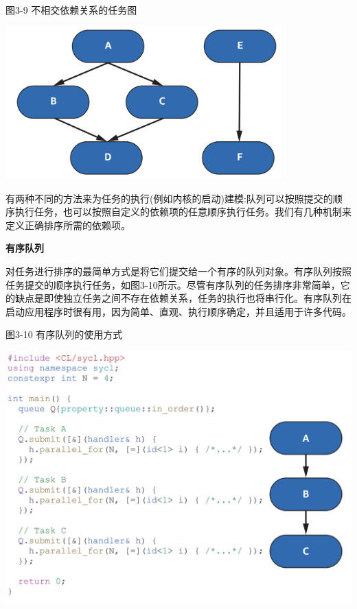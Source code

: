\hspace*{\fill} \par %
图3-9 不相交依赖关系的任务图
\begin{center}
	\includegraphics[width=0.8\textwidth]{content/chapter-3/images/5}
\end{center}

有两种不同的方法来为任务的执行(例如内核的启动)建模:队列可以按照提交的顺序执行任务，也可以按照自定义的依赖项的任意顺序执行任务。我们有几种机制来定义正确排序所需的依赖项。\par

\hspace*{\fill} \par %
\textbf{有序队列}

对任务进行排序的最简单方式是将它们提交给一个有序的队列对象。有序队列按照任务提交的顺序执行任务，如图3-10所示。尽管有序队列的任务排序非常简单，它的缺点是即使独立任务之间不存在依赖关系，任务的执行也将串行化。有序队列在启动应用程序时很有用，因为简单、直观、执行顺序确定，并且适用于许多代码。\par

\hspace*{\fill} \par %
图3-10 有序队列的使用方式
\begin{center}
	\includegraphics[width=1.0\textwidth]{content/chapter-3/images/6}
\end{center}

